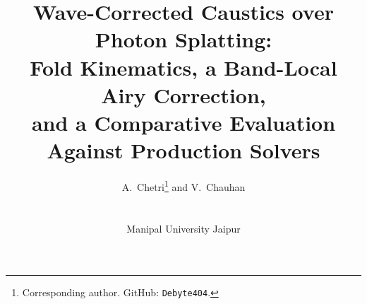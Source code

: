 \title[Wave-Corrected Caustics over Photon Splatting]%
      {Wave-Corrected Caustics over Photon Splatting:\\[2pt]
       Fold Kinematics, a Band-Local Airy Correction,\\ and a Comparative Evaluation Against Production Solvers}

\author[A. Chetri \& V. Chauhan]
{\parbox{0.98\textwidth}{\centering A.\ Chetri\thanks{Corresponding author.
        GitHub: \texttt{Debyte404}.}
        \quad and \quad
        V.\ Chauhan
        }
        \\
{\parbox{0.98\textwidth}{\centering Manipal University Jaipur
       }
}}

\maketitle

